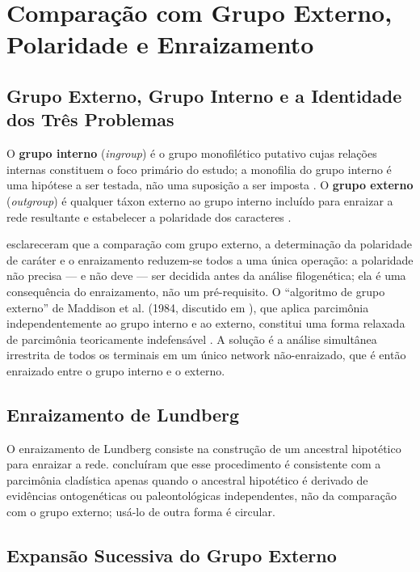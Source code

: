 \section{Comparação com Grupo Externo, Polaridade e Enraizamento}
\label{sec:outgroup}

\subsection{Grupo Externo, Grupo Interno e a Identidade dos Três Problemas}

O \textbf{grupo interno} (\textit{ingroup}) é o grupo monofilético putativo cujas relações internas constituem o foco primário do estudo; a monofilia do grupo interno é uma hipótese a ser testada, não uma suposição a ser imposta \parencite{nixon1993}. O \textbf{grupo externo} (\textit{outgroup}) é qualquer táxon externo ao grupo interno incluído para enraizar a rede resultante e estabelecer a polaridade dos caracteres \parencite{nixon1993,grant2019}.

\textcite{nixon1993} esclareceram que a comparação com grupo externo, a determinação da polaridade de caráter e o enraizamento reduzem-se todos a uma única operação: a polaridade não precisa --- e não deve --- ser decidida antes da análise filogenética; ela é uma consequência do enraizamento, não um pré-requisito. O ``algoritmo de grupo externo'' de Maddison et al. (1984, discutido em \cite{nixon1993}), que aplica parcimônia independentemente ao grupo interno e ao externo, constitui uma forma relaxada de parcimônia teoricamente indefensável \parencite{nixon1993}. A solução é a análise simultânea irrestrita de todos os terminais em um único network não-enraizado, que é então enraizado entre o grupo interno e o externo.

\subsection{Enraizamento de Lundberg}

O enraizamento de Lundberg consiste na construção de um ancestral hipotético para enraizar a rede. \textcite{nixon1993} concluíram que esse procedimento é consistente com a parcimônia cladística apenas quando o ancestral hipotético é derivado de evidências ontogenéticas ou paleontológicas independentes, não da comparação com o grupo externo; usá-lo de outra forma é circular.

\subsection{Expansão Sucessiva do Grupo Externo}

